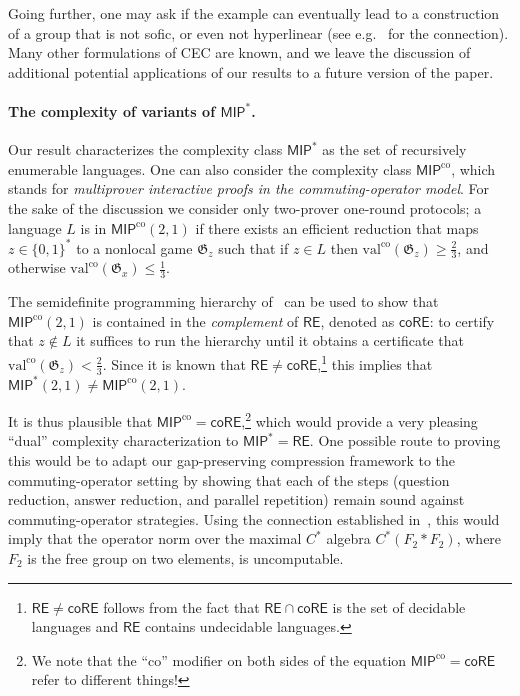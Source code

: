 \documentclass[11pt]{article}
\theoremstyle{definition}
\newcommand{\valco}{\ensuremath{\mathrm{val}^{\mathrm{co}}}}
\newcommand{\game}{\mathfrak{G}}
\newcommand{\class}[1]{\ensuremath{\mathsf{#1}}\xspace}
\newcommand{\MIP}{\class{MIP}} %
\newcommand{\MIPco}{\class{MIP^{\mathrm{co}}}} %
\newcommand{\RE}{\class{RE}} %
\newcommand{\coRE}{\class{coRE}}
\begin{document}
Going further, one may ask if the example can eventually lead to a construction of a group that is not sofic, or even not hyperlinear (see e.g.~\cite{capraro2015introduction} for the connection). Many other formulations of CEC are known, and we leave the discussion of additional potential applications of our results to a future version of the paper. 

\paragraph{The complexity of variants of $\MIP^*$.} Our result characterizes the complexity class $\MIP^*$ as the set of recursively enumerable languages. One can also consider the complexity class $\MIPco$, which stands for \emph{multiprover interactive proofs in the commuting-operator model}. For the sake of the discussion we consider only two-prover one-round protocols; a language $L$ is in $\MIPco(2,1)$ if there exists an efficient reduction that maps $z \in \{0,1\}^*$ to a nonlocal game $\game_z$ such that if $z \in L$ then $\valco(\game_z) \geq \frac{2}{3}$, and otherwise $\valco(\game_x) \leq \frac{1}{3}$.

The semidefinite programming hierarchy of~\cite{navascues2008convergent,doherty2008quantum} can be used to show that $\MIPco(2,1)$ is contained in the \emph{complement} of $\RE$, denoted as $\coRE$: to certify that $z \notin L$ it suffices to run the hierarchy until it obtains a certificate that $\valco(\game_z) < \frac{2}{3}$. Since it is known that $\RE \neq \coRE$,\footnote{$\RE \neq \coRE$ follows from the fact that $\RE \cap \coRE$ is the set of decidable languages and $\RE$ contains undecidable languages.} this implies that $\MIP^*(2,1) \neq \MIPco(2,1)$.

It is thus plausible that $\MIPco = \coRE$,\footnote{We note that the ``co'' modifier on both sides of the equation $\MIPco = \coRE$ refer to different things!} which would provide a very pleasing ``dual'' complexity characterization to $\MIP^* = \RE$. One possible route to proving this would be to adapt our gap-preserving compression framework to the commuting-operator setting by showing that each of the steps (question reduction, answer reduction, and parallel repetition) remain sound against commuting-operator strategies. Using the connection established in~\cite{fritz2014can}, this would imply that the operator norm over the maximal $C^*$ algebra $C^*(F_2 * F_2)$, where $F_2$ is the free group on two elements, is uncomputable. 
\end{document}
